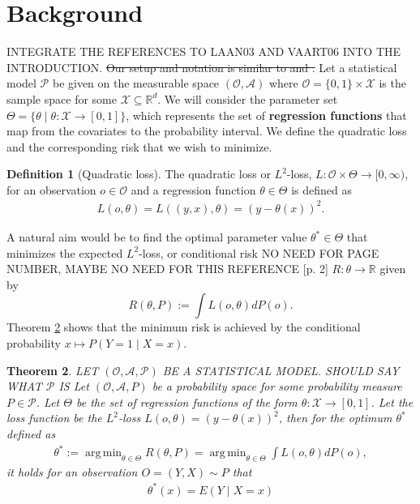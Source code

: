 \documentclass[11pt, a4paper]{article}
\DeclareMathOperator*{\argmin}{arg\,min}
\renewcommand\tag[1]{\color{blue} #1 \color{black}}
\newtheorem{theorem}{Theorem}
\theoremstyle{definition}
\newtheorem{definition}[theorem]{Definition}
\theoremstyle{remark}
\newcommand{\btheta}{\theta}
\begin{document}
\section{Background}
\tag{INTEGRATE THE REFERENCES TO LAAN03 AND VAART06 INTO THE
  INTRODUCTION.}  \sout{Our setup and notation is similar to
  \cite{laan03} and \cite{vaart06}.}  Let a statistical model
$ \mathcal{P} $ be given on the measurable space
$ (\mathcal{O}, \mathcal{A}) $ where
$ \mathcal{O} = \{0,1\} \times \mathcal{X} $ is the sample space for
some $ \mathcal{X} \subseteq \mathbb{R}^{d} $.  We will consider the
parameter set
$ \Theta = \{\btheta \mid \btheta : \mathcal{X} \to [0,1]\} $, which
represents the set of \textbf{regression functions} that map from the
covariates to the probability interval. We define the quadratic loss
and the corresponding risk that we wish to minimize.
\begin{definition}[Quadratic loss]
    The quadratic loss or $ L^2 $-loss, $ L : \mathcal{O} \times \Theta \to [0, \infty) $, for an observation $ o \in \mathcal{O} $ and a regression function $ \btheta \in \Theta $ is defined as 
\begin{align*}
    L(o, \btheta) = L((y,x), \btheta) = (y - \btheta(x))^2.
\end{align*}
\end{definition}
A natural aim would be to find the optimal parameter value
$\btheta^* \in \Theta$ that minimizes the expected $L^2$-loss, or
conditional risk \tag{NO NEED FOR PAGE NUMBER, MAYBE NO NEED FOR THIS REFERENCE}
\parencite{laan03}[p. 2] $R: \btheta \to \mathbb{R}$
given by
\begin{equation} \label{l2risk}
    R(\btheta, P) := \int L(o, \btheta)  dP(o).
\end{equation}
Theorem \ref{minrisk} shows that the minimum risk is achieved by the conditional probability $ x \mapsto P(Y = 1\mid X = x) $. 
\begin{theorem} \label{minrisk}
  \tag{ LET $ (\mathcal{O} , \mathcal{A}, \mathcal P) $ BE A STATISTICAL MODEL. SHOULD SAY WHAT \(\mathcal P\) IS}
    Let $ (\mathcal{O} , \mathcal{A}, P) $ be a probability space for some probability measure $ P \in \mathcal{P} $. Let $ \Theta $ be the set of regression functions of the form $ \btheta : \mathcal{X} \to [0,1] $. Let the loss function be the $ L^2 $-loss $ L(o, \btheta) = (y - \btheta(x))^2 $, then for the optimum $ \btheta^* $ defined as 
    \begin{align*}
        \btheta^* := \argmin_{\btheta \in \Theta} R(\btheta, P)= \argmin_{\btheta \in \Theta} \int L(o, \btheta)  dP(o),
    \end{align*}
    it holds for an observation $ O = (Y, X) \sim P $ that
    \begin{align*}
        \btheta^{*}(x) = E(Y \mid X = x) 
    \end{align*}
\end{theorem}
\end{document}
